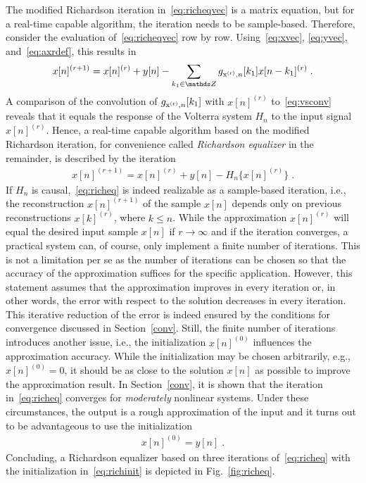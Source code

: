 \documentclass[10pt,twocolumn,twoside]{IEEEtran}
\begin{document}
The modified Richardson iteration in~\eqref{eq:richeqvec} is a matrix equation, but
for a real-time capable algorithm, the iteration needs to be sample-based. Therefore,
consider the evaluation of~\eqref{eq:richeqvec} row by row. Using~\eqref{eq:xvec},
\eqref{eq:yvec}, and~\eqref{eq:axrdef}, this results in
\begin{align*}
	x[n]^{(r+1)} = x[n]^{(r)} + y[n] - \sum_{k_1\in\Z} \sg{x^{(r)}}{n}[k_1] x[n-k_1]^{(r)}\;.
\end{align*}
A comparison of the convolution of $g_{\mathrm{x^{(r)}},n}[k_1]$ with $x[n]^{(r)}$ to~\eqref{eq:vsconv}
reveals that it equals the response of the Volterra system $H_n$ to the
input signal $x[n]^{(r)}$. Hence, a real-time capable algorithm based on the modified Richardson iteration,
for convenience called \emph{Richardson equalizer} in the remainder, is described by the
iteration
\begin{align}
	x[n]^{(r+1)} = x[n]^{(r)} + y[n] - H_n\{x[n]^{(r)}\}\;.
	\label{eq:richeq}
\end{align}
If $H_n$ is causal,~\eqref{eq:richeq} is indeed realizable as a sample-based iteration,
i.e., the reconstruction $x[n]^{(r+1)}$ of the sample $x[n]$ depends only on previous
reconstructions $x[k]^{(r)}$, where $k \leq n$. 
While the approximation $x[n]^{(r)}$ will equal the desired input sample $x[n]$
if $r\rightarrow\infty$ and if the iteration converges,
a practical system can, of course, only implement a finite number of iterations.
This is not a limitation per se as the number of iterations can be
chosen so that the accuracy of the approximation suffices for the specific application.
However, this statement assumes that the approximation improves in every iteration or,
in other words, the error with respect to the solution decreases in every iteration.
This iterative reduction of the error is indeed ensured by the conditions for
convergence discussed in Section~\ref{conv}.
Still, the finite number of iterations introduces another issue, i.e.,
the initialization $x[n]^{(0)}$ influences the approximation accuracy.
While the initialization may be chosen arbitrarily, e.g., $x[n]^{(0)} = 0$,
it should be as close to the solution $x[n]$ as possible to improve the approximation result.
In Section~\ref{conv}, it is shown that the iteration in~\eqref{eq:richeq} converges
for \emph{moderately} nonlinear systems.
Under these circumstances, the output is a rough approximation of the input and
it turns out to be advantageous to use the initialization
\begin{align}
	x[n]^{(0)} = y[n]\;.
	\label{eq:richinit}
\end{align}
Concluding, a Richardson equalizer based on three iterations of~\eqref{eq:richeq}
with the initialization in~\eqref{eq:richinit} is depicted in Fig.~\ref{fig:richeq}.
\end{document}

